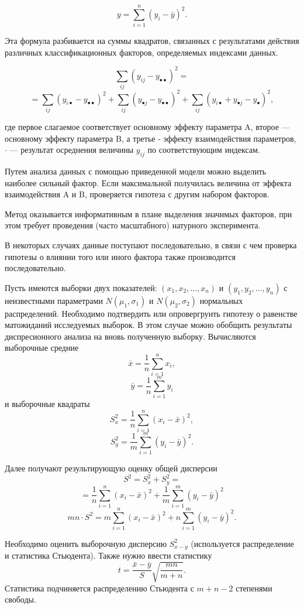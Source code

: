 \documentclass[12pt]{article}
\begin{document}
\[ y = \sum_{i=1}^n \left(y_i - \bar{y} \right)^2.\]

Эта формула разбивается на суммы квадратов, связанных с результатами действия различных классификационных факторов, определяемых индексами данных.

\[ \sum_{ij} \left( y_{ij} - y_{\bullet \bullet } \right)^2 = \]
\[ = \sum_{ij} \left( y_{i\bullet } - y_{\bullet \bullet } \right)^2 + \sum_{ij} \left( y_{\bullet  j} - y_{\bullet \bullet } \right)^2 + \sum_{ij} \left( y_{i \bullet } + y_{\bullet j} - y_{\bullet } \right)^2, \]

где первое слагаемое соответствует основному эффекту параметра A, второе --- основному эффекту параметра B, а третье - эффекту взаимодействия параметров, $\cdot$ --- результат осреднения величины $y_{ij}$ по соответствующим индексам.

Путем анализа данных с помощью приведенной модели можно выделить наиболее сильный фактор. Если максимальной получилась величина от эффекта взаимодействия A и B, проверяется гипотеза с другим набором факторов.

Метод оказывается информативным в плане выделения значимых факторов, при этом требует проведения (часто масштабного) натурного эксперимента.

В некоторых случаях данные поступают последовательно, в связи с чем проверка гипотезы о влиянии того или иного фактора также производится последовательно.

Пусть имеются выборки двух показателей: $(x_1, x_2, \ldots, x_n)$ и $(y_1, y_2, \ldots, y_n)$ с неизвестными параметрами $N(\mu_1, \sigma_1)$ и $N(\mu_2, \sigma_2)$ нормальных распределений. Необходимо подтвердить или опровергрунть гипотезу о равенстве матожиданий исследуемых выборок. В этом случае можно обобщить результаты диспресионного анализа на вновь полученную выборку. Вычисляются выборочные средние
\[ \bar{x} = \frac{1}{n} \sum_{i=1}^n x_i,\]
\[ \bar{y} = \frac{1}{n} \sum_{i=1}^m y_i\]
и выборочные квадраты
\[ S_x^2 = \frac{1}{n} \sum_{i=1}^n (x_i - \bar{x})^2,\]
\[ S_y^2 = \frac{1}{m} \sum_{i=1}^m (y_i - \bar{y})^2.\]

Далее получают результирующую оценку общей дисперсии
\[ S^2 = S_x^2 + S_y^2 = \]
\[ = \frac{1}{n} \sum_{i=1}^n (x_i - \bar{x})^2 + \frac{1}{m} \sum_{i=1}^m (y_i - \bar{y})^2 \]
\[ mn \cdot S^2 = m \sum_{i=1}^n (x_i - \bar{x})^2 + n \sum_{i=1}^m (y_i - \bar{y})^2.\]

Необходимо оценить выборочную дисперсию $S_{x-y}^2$ (используется распределение и статистика Стьюдента). Также нужно ввести статистику
\[ t = \frac{\bar{x} - \bar{y}}{S} \sqrt{\frac{mn}{m + n}}. \]
Статистика подчиняется распределению Стьюдента с $m + n - 2$ степенями свободы.
\end{document}
